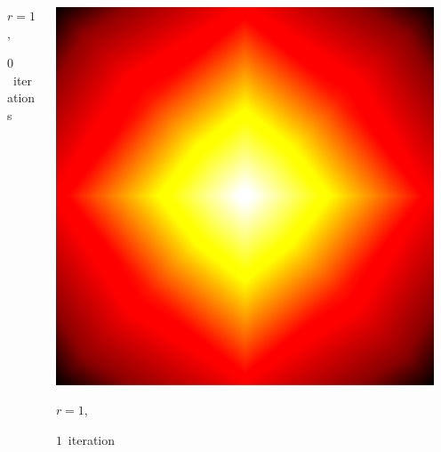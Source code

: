 \documentclass[aspectratio=169,t]{beamer}
\begin{document}
{\begin{columns}
\begin{column}{0.22\textwidth}
			{\footnotesize
				\par \vspace{-1mm} $r=1$,
				\par \vspace{-1mm} $0$~iterations
			}
		\end{column}
		\begin{column}{0.22\textwidth}
			\centering
			\includegraphics[width=.85\textwidth]{data/synthetic_meshes/square_tesselation_4tri_Dirac_delta_1_v13_f16_funcvals_1iter.png}
			{\footnotesize
				\par \vspace{-1mm} $r=1$,
				\par \vspace{-1mm} $1$~iteration
			}
		\end{column}
		\begin{column}{0.17\textwidth}~\end{column}
	\end{columns}
	\vspace*{4mm}
	\begin{columns}
		\begin{column}{0.17\textwidth}~\end{column}
		\begin{column}{0.22\textwidth}
			\centering

\end{column}
\end{columns}}
\end{document}
